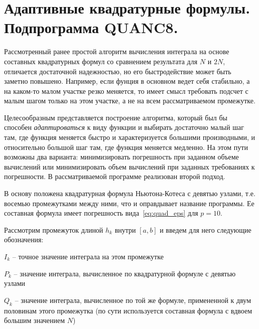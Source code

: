 \documentclass[../../calc-math-exam-2023.tex]{subfiles}
\begin{document}
    \section{Адаптивные квадратурные формулы. Подпрограмма \textbf{QUANC8}.}\label{sec:ch11}
        Рассмотренный ранее простой алгоритм вычисления интеграла на основе
    составных квадратурных формул со сравнением результата для $N$ и $2N$,
    отличается достаточной надежностью, но его быстродействие может быть
    заметно повышено. Например, если фунция в основном ведет себя
    стабильно, а на каком-то малом участке резко меняется, то имеет смысл
    требовать подсчет с малым шагом только на этом участке, а не на всем
    рассматриваемом промежутке.

    Целесообразным представляется построение алгоритма, который был бы
    способен \emph{адаптироваться} к виду функции и выбирать достаточно
    малый шаг там, где функция меняется быстро и характеризуется большими
    производными, и относительно большой шаг там, где функция меняется
    медленно. На этом пути возможны два варианта: минимизировать погрешность
    при заданном объеме вычислений или минимизировать объем вычислений при
    заданных требованиях к погрешности. В рассматриваемой программе
    реализован второй подход.

    В основу положена квадратурная формула Ньютона-Котеса с девятью узлами,
    т.е. восемью промежутками между ними, что и оправдывает название
    программы. Ее составная формула имеет погрешность вида~\eqref{eq:quad_eps} для $p=10$.

    Рассмотрим промежуток длиной $h_k$ внутри $[a, b]$ и введем для него
    следующие обозначения:

    $I_k$ -- точное значение интеграла на этом промежутке

    $P_k$ -- значение интеграла, вычисленное по квадратурной формуле с девятью узлами

    $Q_k$ -- значение интеграла, вычисленное по той же формуле, примененной к двум
    половинам этого промежутка (по сути используется составная формула с вдвоем
    большим значением $N$)
\end{document}
